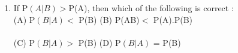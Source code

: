 \begin{enumerate}[label=\thechapter.\arabic*,ref=\thechapter.\theenumi]
\item If P$(A|B)>$P(A), then which of the following is correct :\\
(A) P$(B|A)<$ P(B) (B) P(AB)$ <$ P(A).P(B)\\
\\
(C) P$(B|A)>$ P(B) (D) P$(B|A)$ = P(B)\\
\end{enumerate}
